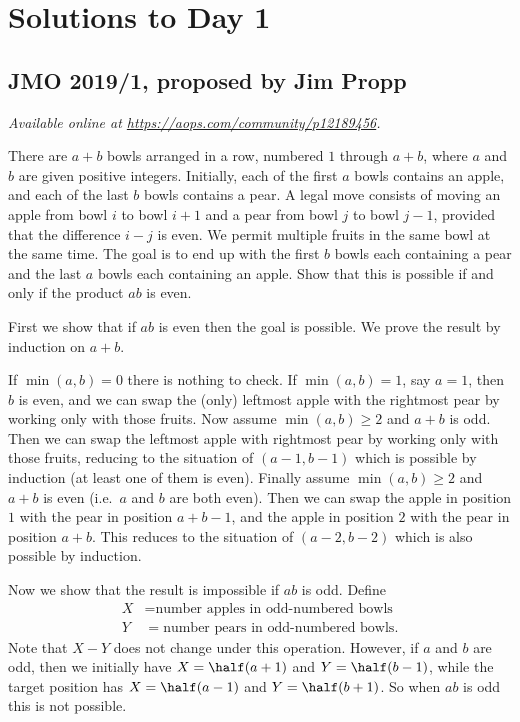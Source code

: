 \documentclass[11pt]{scrartcl}
\begin{document}
\section{Solutions to Day 1}
\subsection{JMO 2019/1, proposed by Jim Propp}
\textsl{Available online at \url{https://aops.com/community/p12189456}.}
\begin{mdframed}[style=mdpurplebox,frametitle={Problem statement}]
There are $a+b$ bowls arranged in a row,
numbered $1$ through $a+b$,
where $a$ and $b$ are given positive integers.
Initially, each of the first $a$ bowls contains an apple,
and each of the last $b$ bowls contains a pear.
A legal move consists of moving an apple from bowl $i$ to bowl $i+1$
and a pear from bowl $j$ to bowl $j-1$,
provided that the difference $i-j$ is even.
We permit multiple fruits in the same bowl at the same time.
The goal is to end up with the first $b$ bowls each containing a pear
and the last $a$ bowls each containing an apple.
Show that this is possible if and only if the product $ab$ is even.
\end{mdframed}
First we show that if $ab$ is even then the goal is possible.
We prove the result by induction on $a+b$.
\begin{itemize}
  \ii If $\min(a,b) = 0$ there is nothing to check.
  \ii If $\min(a,b) = 1$, say $a=1$, then $b$ is even,
  and we can swap the (only) leftmost apple
  with the rightmost pear by working only with those fruits.
  \ii Now assume $\min(a,b) \ge 2$ and $a+b$ is odd.
  Then we can swap the leftmost apple with rightmost pear
  by working only with those fruits,
  reducing to the situation of $(a-1, b-1)$
  which is possible by induction
  (at least one of them is even).
  \ii Finally assume $\min(a,b) \ge 2$ and $a+b$ is even
  (i.e.\ $a$ and $b$ are both even).
  Then we can swap the apple in position $1$
  with the pear in position $a+b-1$,
  and the apple in position $2$ with the pear in position $a+b$.
  This reduces to the situation of $(a-2, b-2)$
  which is also possible by induction.
\end{itemize}

Now we show that the result is impossible if $ab$ is odd.
Define
\begin{align*}
  X &= \text{number apples in odd-numbered bowls} \\
  Y &= \text{number pears in odd-numbered bowls}.
\end{align*}
Note that $X-Y$ does not change under this operation.
However, if $a$ and $b$ are odd,
then we initially have $X = \half(a+1)$ and $Y = \half(b-1)$,
while the target position has $X = \half(a-1)$ and $Y = \half(b+1)$.
So when $ab$ is odd this is not possible.
\end{document}
